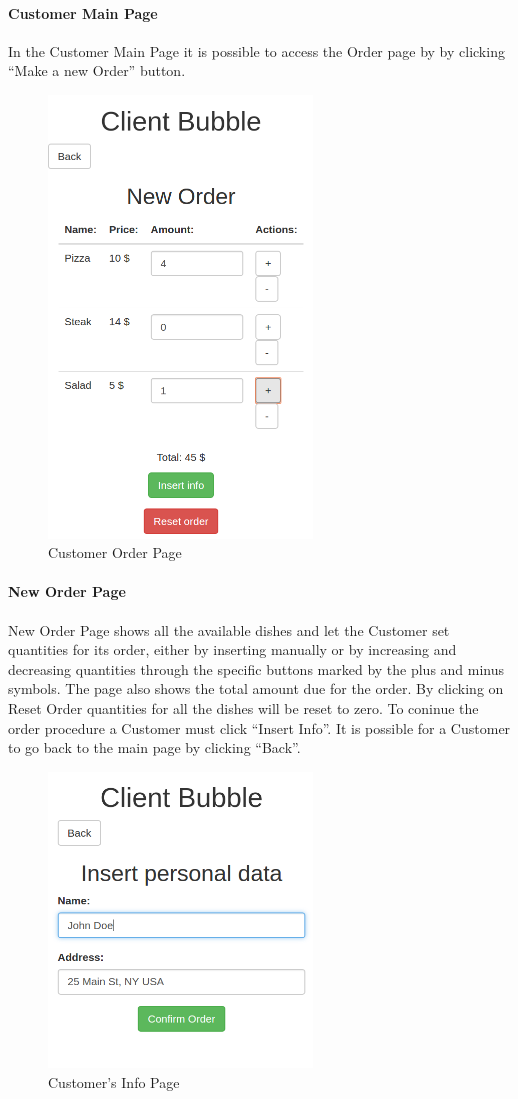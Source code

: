 \paragraph{Customer Main Page}
In the Customer Main Page it is possible to access the Order page by by clicking ``Make a new Order'' button.
\begin{figure}[H]
	\centering
	\includegraphics[width=7cm]{../../documenti/UserManualDemo/demo_screens/client_dishes.png}
	\caption{Customer Order Page}
\end{figure}
\paragraph{New Order Page}
New Order Page shows all the available dishes and let the Customer set quantities for its order, either by inserting manually or by increasing and decreasing quantities through the specific buttons marked by the plus and minus symbols. The page also shows the total amount due for the order.
By clicking on Reset Order quantities for all the dishes will be reset to zero.
To coninue the order procedure a Customer must click ``Insert Info''. 
It is possible for a Customer to go back to the main page by clicking ``Back''.

\begin{figure}[H]
	\centering
	\includegraphics[width=7cm]{../../documenti/UserManualDemo/demo_screens/client_info.png}
	\caption{Customer's Info Page}
\end{figure}
